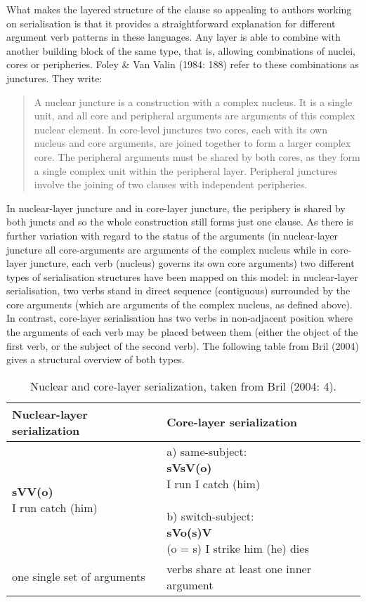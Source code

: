 What makes the layered structure of the clause so appealing to authors working on serialisation is that it provides a straightforward explanation for different argument verb patterns in these languages. Any layer is able to combine with another building block of the same type, that is, allowing combinations of nuclei, cores or peripheries. Foley \& Van Valin (1984: 188) refer to these combinations as junctures. They write:

\begin{quote}A nuclear juncture is a construction with a complex nucleus. It is a single unit, and all core and peripheral arguments are arguments of this complex nuclear element. In core-level junctures two cores, each with its own nucleus and core arguments, are joined together to form a larger complex core. The peripheral arguments must be shared by both cores, as they form a single complex unit within the peripheral layer. Peripheral junctures involve the joining of two clauses with independent peripheries.\end{quote}

In nuclear-layer juncture and in core-layer juncture, the periphery is shared by both juncts and so the whole construction still forms just one clause. As there is further variation with regard to the status of the arguments (in nuclear-layer juncture all core-arguments are arguments of the complex nucleus while in core-layer juncture, each verb (nucleus) governs its own core arguments) two different types of serialisation structures have been mapped on this model: in nuclear-layer serialisation, two verbs stand in direct sequence (contiguous) surrounded by the core arguments (which are arguments of the complex nucleus, as defined above). In contrast, core-layer serialisation has two verbs in non-adjacent position where the arguments of each verb may be placed between them (either the object of the first verb, or the subject of the second verb). The following table from Bril (2004) gives a structural overview of both types.

\begin{table}


\begin{tabular}{ll}
\hline \textbf{Nuclear-layer serialization} & \textbf{Core-layer serialization} \\
\hline 
\pbox[c]{0.5\textwidth}{\textbf{sVV(o)} \\
 I run catch (him) } & 
 \pbox[c]{0.5\textwidth}{ a) same-subject: \\ \textbf{sVsV(o)} \\
 I run I catch (him) \\  \\
 b) switch-subject: \\ \textbf{sVo(s)V} \\ 
 (o = s) I strike him (he) dies }  \\
\hline
one single set of arguments & verbs share at least one inner argument \\
\hline
\end{tabular}
\caption[Nuclear and core-layer serialization]{Nuclear and core-layer serialization, taken from Bril (2004: 4).}


\end{table}
\

